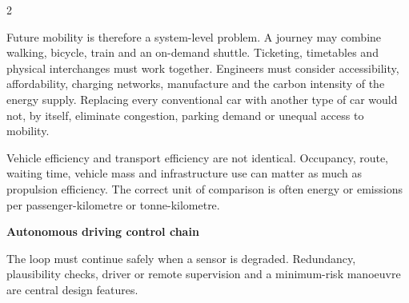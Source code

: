 \begin{multicols}{2}
\begin{ecarticle}
Future mobility is therefore a system-level problem. A journey may combine walking, bicycle, train
and an on-demand shuttle. Ticketing, timetables and physical interchanges must work together.
Engineers must consider accessibility, affordability, charging networks, manufacture and the carbon
intensity of the energy supply. Replacing every conventional car with another type of car would not,
by itself, eliminate congestion, parking demand or unequal access to mobility.
\end{ecarticle}

\begin{tcolorbox}[title=\sffamily\bfseries Engineering Insight,colback=yellow!10,colframe=ECOrange]
Vehicle efficiency and transport efficiency are not identical. Occupancy, route, waiting time,
vehicle mass and infrastructure use can matter as much as propulsion efficiency. The correct unit of
comparison is often energy or emissions per passenger-kilometre or tonne-kilometre.
\end{tcolorbox}

\begin{engineeringfocus}
\textbf{Autonomous driving control chain}
\begin{center}
\end{center}
The loop must continue safely when a sensor is degraded. Redundancy, plausibility checks, driver or
remote supervision and a minimum-risk manoeuvre are central design features.
\end{engineeringfocus}


\end{multicols}
